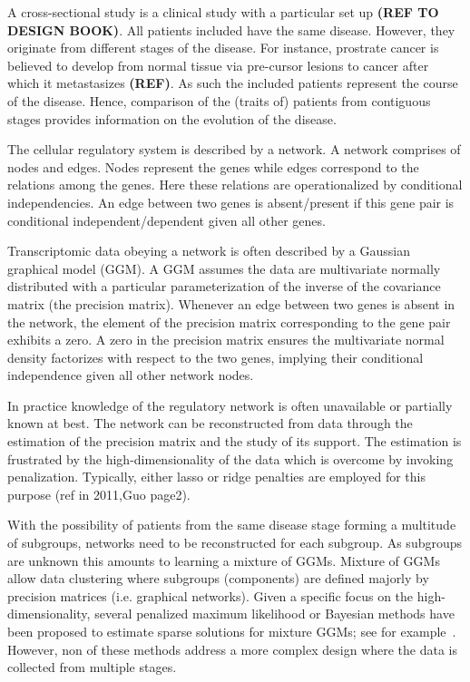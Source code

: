 \documentclass[10pt]{article}
\begin{document}
\medskip
A cross-sectional study is a clinical study with a particular set up \textbf{(REF TO DESIGN BOOK)}. All patients included have the same disease. However, they originate from different stages of the disease. For instance, prostrate cancer is believed to develop from normal tissue via pre-cursor lesions to cancer after which it metastasizes \textbf{(REF)}. As such the included patients represent the course of the disease. Hence, comparison of the (traits of) patients from contiguous stages provides information on the evolution of the disease.
\medskip


The cellular regulatory system is described by a network. A network comprises of nodes and edges. Nodes represent the genes while edges correspond to the relations among the genes. Here these relations are operationalized by conditional independencies. An edge between two genes is absent/present if this gene pair is conditional independent/dependent given all other genes.


\medskip
Transcriptomic data obeying a network is often described by a Gaussian graphical model (GGM). A GGM assumes the data are multivariate normally  distributed with a particular parameterization of the inverse of the covariance matrix (the precision matrix). Whenever an edge between two genes is absent in the network, the element of the precision matrix corresponding to the gene pair exhibits a zero. A zero in the precision matrix ensures the multivariate normal density factorizes with respect to the two genes, implying their conditional independence given all other network nodes.


\medskip
In practice knowledge of the regulatory network is often unavailable or partially known at best. The network can be reconstructed from data through the estimation of the precision matrix and the study of its support. The estimation is frustrated by the high-dimensionality of the data which is overcome by invoking penalization. Typically, either lasso or ridge penalties are employed for this purpose (ref in 2011,Guo page2).
\\
\medskip

With the possibility of patients from the same disease stage forming a multitude of subgroups, networks need to be reconstructed for each subgroup. As subgroups are unknown this amounts to learning a mixture of GGMs. Mixture of GGMs allow data clustering where subgroups (components) are defined majorly by precision matrices (i.e. graphical networks). Given a specific focus on the high-dimensionality, several penalized maximum likelihood or Bayesian methods have been proposed to estimate sparse solutions for mixture GGMs; see for example~\citet{raftery2006variable,maugis2009,maugis2011non,ruan2011,lotsi2013,hill2013,azizyan2015}. However, non of these methods address a more complex design where the data is collected from multiple stages.
\end{document}
